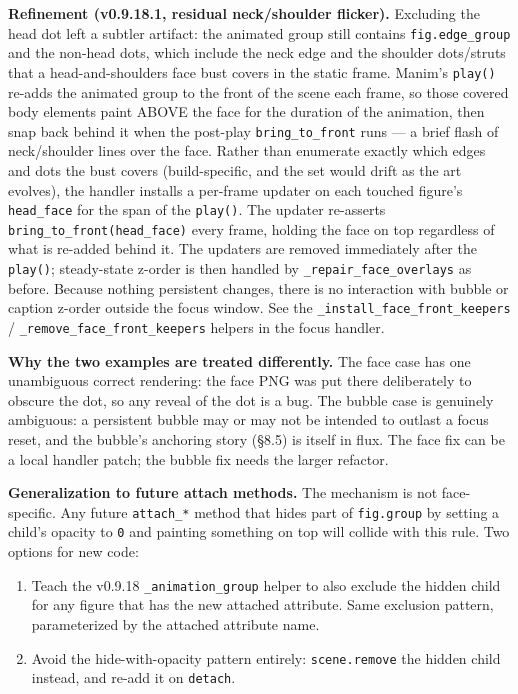 \documentclass[
  12pt,
  letterpaper,
]{book}
\providecommand{\tightlist}{%
  \setlength{\itemsep}{0pt}\setlength{\parskip}{0pt}}
\begin{document}
\textbf{Refinement (v0.9.18.1, residual neck/shoulder flicker).}
Excluding the head dot left a subtler artifact: the animated group
still contains \texttt{fig.edge\_group} and the non-head dots, which
include the neck edge and the shoulder dots/struts that a
head-and-shoulders face bust covers in the static frame. Manim's
\texttt{play()} re-adds the animated group to the front of the scene
each frame, so those covered body elements paint ABOVE the face for
the duration of the animation, then snap back behind it when the
post-play \texttt{bring\_to\_front} runs --- a brief flash of
neck/shoulder lines over the face. Rather than enumerate exactly
which edges and dots the bust covers (build-specific, and the set
would drift as the art evolves), the handler installs a per-frame
updater on each touched figure's \texttt{head\_face} for the span of
the \texttt{play()}. The updater re-asserts
\texttt{bring\_to\_front(head\_face)} every frame, holding the face
on top regardless of what is re-added behind it. The updaters are
removed immediately after the \texttt{play()}; steady-state z-order
is then handled by \texttt{\_repair\_face\_overlays} as before.
Because nothing persistent changes, there is no interaction with
bubble or caption z-order outside the focus window. See the
\texttt{\_install\_face\_front\_keepers} /
\texttt{\_remove\_face\_front\_keepers} helpers in the focus handler.

\medskip

\textbf{Why the two examples are treated differently.} The face case
has one unambiguous correct rendering: the face PNG was put there
deliberately to obscure the dot, so any reveal of the dot is a bug.
The bubble case is genuinely ambiguous: a persistent bubble may or
may not be intended to outlast a focus reset, and the bubble's
anchoring story (\S 8.5) is itself in flux. The face fix can be a
local handler patch; the bubble fix needs the larger refactor.

\medskip

\textbf{Generalization to future attach methods.} The mechanism is
not face-specific. Any future \texttt{attach\_*} method that hides
part of \texttt{fig.group} by setting a child's opacity to \texttt{0}
and painting something on top will collide with this rule. Two
options for new code:

\begin{enumerate}
\tightlist
\item
  Teach the v0.9.18 \texttt{\_animation\_group} helper to also
  exclude the hidden child for any figure that has the new attached
  attribute. Same exclusion pattern, parameterized by the attached
  attribute name.
\item
  Avoid the hide-with-opacity pattern entirely: \texttt{scene.remove}
  the hidden child instead, and re-add it on \texttt{detach}.
\end{enumerate}
\end{document}
